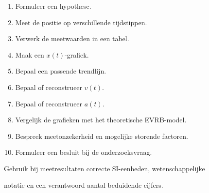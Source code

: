 \documentclass{ximera}
\begin{document}

\begin{enumerate}

 \item Formuleer een hypothese.

 \item Meet de positie op verschillende tijdstippen.

 \item Verwerk de meetwaarden in een tabel.

 \item Maak een $x(t)$-grafiek.

 \item Bepaal een passende trendlijn.

 \item Bepaal of reconstrueer $v(t)$.

 \item Bepaal of reconstrueer $a(t)$.

 \item Vergelijk de grafieken met het theoretische EVRB-model.

 \item Bespreek meetonzekerheid en mogelijke storende factoren.

 \item Formuleer een besluit bij de onderzoeksvraag.

\end{enumerate}

\begin{opmerking}

Gebruik bij meetresultaten correcte SI-eenheden, wetenschappelijke

notatie en een verantwoord aantal beduidende cijfers.

\end{opmerking}




\end{document}
